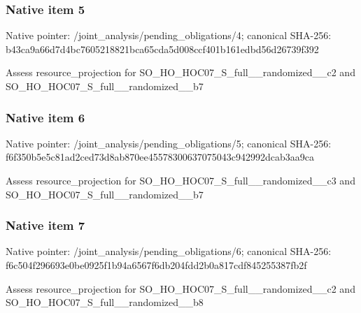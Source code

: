 \documentclass[10pt,a4paper]{article}
\begin{document}
\subsubsection{Native item 5}
Native pointer: /joint\_\allowbreak{}analysis/pending\_\allowbreak{}obligations/4; canonical SHA-256: b43ca9a66d7d4bc7605218821bca65cda5d008ccf401b161edbd56d26739f392

\begingroup\raggedright\sloppy Assess resource\_\allowbreak{}projection for SO\_\allowbreak{}HO\_\allowbreak{}HOC07\_\allowbreak{}S\_\allowbreak{}full\_\allowbreak{}\_\allowbreak{}randomized\_\allowbreak{}\_\allowbreak{}c2 and SO\_\allowbreak{}HO\_\allowbreak{}HOC07\_\allowbreak{}S\_\allowbreak{}full\_\allowbreak{}\_\allowbreak{}randomized\_\allowbreak{}\_\allowbreak{}b7\par\endgroup

\subsubsection{Native item 6}
Native pointer: /joint\_\allowbreak{}analysis/pending\_\allowbreak{}obligations/5; canonical SHA-256: f6f350b5e5c81ad2ced73d8ab870ee45578300637075043c942992dcab3aa9ca

\begingroup\raggedright\sloppy Assess resource\_\allowbreak{}projection for SO\_\allowbreak{}HO\_\allowbreak{}HOC07\_\allowbreak{}S\_\allowbreak{}full\_\allowbreak{}\_\allowbreak{}randomized\_\allowbreak{}\_\allowbreak{}c3 and SO\_\allowbreak{}HO\_\allowbreak{}HOC07\_\allowbreak{}S\_\allowbreak{}full\_\allowbreak{}\_\allowbreak{}randomized\_\allowbreak{}\_\allowbreak{}b7\par\endgroup

\subsubsection{Native item 7}
Native pointer: /joint\_\allowbreak{}analysis/pending\_\allowbreak{}obligations/6; canonical SHA-256: f6c504f296693e0be0925f1b94a6567f6db204fdd2b0a817cdf845255387fb2f

\begingroup\raggedright\sloppy Assess resource\_\allowbreak{}projection for SO\_\allowbreak{}HO\_\allowbreak{}HOC07\_\allowbreak{}S\_\allowbreak{}full\_\allowbreak{}\_\allowbreak{}randomized\_\allowbreak{}\_\allowbreak{}c2 and SO\_\allowbreak{}HO\_\allowbreak{}HOC07\_\allowbreak{}S\_\allowbreak{}full\_\allowbreak{}\_\allowbreak{}randomized\_\allowbreak{}\_\allowbreak{}b8\par\endgroup
\end{document}

